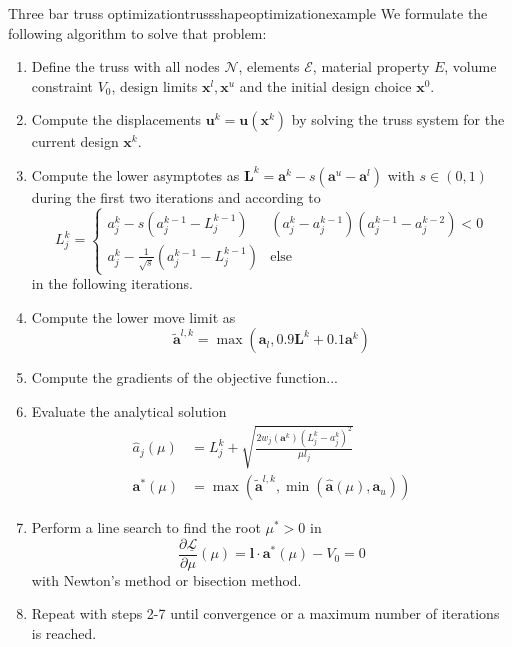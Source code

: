 \begin{example}{Three bar truss optimization}{trussshapeoptimizationexample}
    We formulate the following algorithm to solve that problem: 
    \begin{enumerate}
        \item Define the truss with all nodes $\mathcal{N}$, elements $\mathcal{E}$, material property $E$, volume constraint $V_0$, design limits $\mathbf{x}^l, \mathbf{x}^u$ and the initial design choice $\mathbf{x}^0$.
        \item Compute the displacements $\mathbf{u}^k = \mathbf{u}(\mathbf{x}^k)$ by solving the truss system for the current design $\mathbf{x}^k$.
        \item Compute the lower asymptotes as $\mathbf{L}^k =\mathbf{a}^k - s (\mathbf{a}^u - \mathbf{a}^l)$ with $s \in (0,1)$ during the first two iterations and according to 
        \begin{equation}
            L^k_j = 
            \begin{cases}
                a^k_j - s  (a^{k-1}_j-L^{k-1}_j) & (a_j^k-a_j^{k-1})(a_j^{k-1}-a_j^{k-2}) < 0\\
                a^k_j - \frac{1}{\sqrt{s}}  (a^{k-1}_j-L^{k-1}_j) & \text{else}
            \end{cases}
        \end{equation}
        in the following iterations.


        \item Compute the lower move limit as 
        \begin{equation}
            \tilde{\mathbf{a}}^{l,k} = \max(\mathbf{a}_l,  0.9 \mathbf{L}^k + 0.1 \mathbf{a}^k)
        \end{equation}

        \item Compute the gradients of the objective function...

        \item Evaluate the analytical solution
            \begin{align}
                \hat{a}_j(\mu) &= L_j^k + \sqrt{\frac{2 w_j (\mathbf{a}^k)
                (L^k_j-a^k_j)^2}{\mu l_j}} \\
                \mathbf{a}^* (\mu) &= \max\left(\tilde{\mathbf{a}}^{l,k}, \min \left(\hat{\mathbf{a}}(\mu), \mathbf{a}_u \right)\right)
            \end{align}
        \item Perform a line search to find the root $\mu^*>0$ in 
        \begin{equation}
            \frac{\partial \underline{\mathcal{L}}}{\partial \mu}(\mu) = \mathbf{l} \cdot \mathbf{a}^* (\mu) - V_0 = 0
        \end{equation}
        with Newton's method or bisection method. 
        \item Repeat with steps 2-7 until convergence or a maximum number of iterations is reached.
    \end{enumerate}


\end{example}
